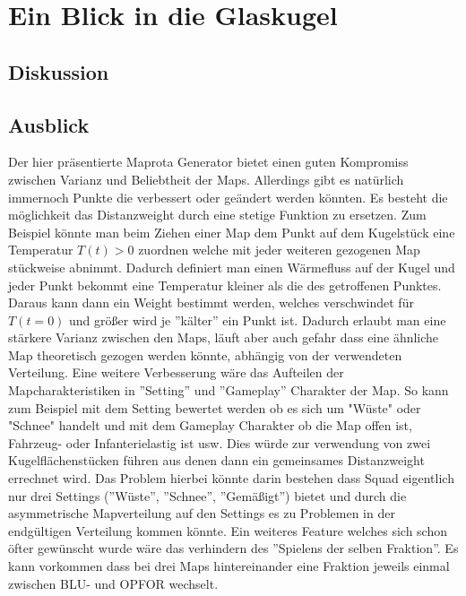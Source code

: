 \section{Ein Blick in die Glaskugel}
    \subsection{Diskussion}
    \subsection{Ausblick}
        Der hier präsentierte Maprota Generator bietet einen guten Kompromiss zwischen Varianz und Beliebtheit der Maps. 
        Allerdings gibt es natürlich immernoch Punkte die verbessert oder geändert werden könnten.
        Es besteht die möglichkeit das Distanzweight durch eine stetige Funktion zu ersetzen. 
        Zum Beispiel könnte man beim Ziehen einer Map dem Punkt auf dem Kugelstück eine Temperatur $T(t)>0$ zuordnen welche mit jeder weiteren gezogenen Map stückweise abnimmt.
        Dadurch definiert man einen Wärmefluss auf der Kugel und jeder Punkt bekommt eine Temperatur kleiner als die des getroffenen Punktes. 
        Daraus kann dann ein Weight bestimmt werden, welches verschwindet für $T(t=0)$ und größer wird je ''kälter'' ein Punkt ist. 
        Dadurch erlaubt man eine stärkere Varianz zwischen den Maps, läuft aber auch gefahr dass eine ähnliche Map theoretisch gezogen werden könnte, abhängig von der verwendeten Verteilung.
        Eine weitere Verbesserung wäre das Aufteilen der Mapcharakteristiken in ''Setting'' und ''Gameplay'' Charakter der Map. 
        So kann zum Beispiel mit dem Setting bewertet werden ob es sich um "Wüste" oder "Schnee" handelt und mit dem Gameplay Charakter ob die Map offen ist, Fahrzeug- oder Infanterielastig ist usw. 
        Dies würde zur verwendung von zwei Kugelflächenstücken führen aus denen dann ein gemeinsames Distanzweight errechnet wird. 
        Das Problem hierbei könnte darin bestehen dass Squad eigentlich nur drei Settings (''Wüste'', ''Schnee'', ''Gemäßigt'') bietet und durch die asymmetrische Mapverteilung auf den Settings es zu Problemen in der endgültigen Verteilung kommen könnte.
        Ein weiteres Feature welches sich schon öfter gewünscht wurde wäre das verhindern des ''Spielens der selben Fraktion''.
        Es kann vorkommen dass bei drei Maps hintereinander eine Fraktion jeweils einmal zwischen BLU- und OPFOR wechselt. 

